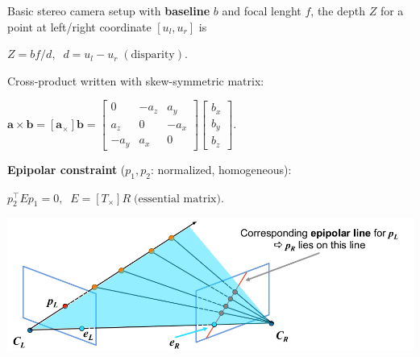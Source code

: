 \documentclass[landscape]{article}
\newcommand{\vmspace}{\vspace{-7pt}}
\newcommand{\vpspace}{\vspace{5pt}}
\begin{document}
\begin{multicols}{3}
\begin{minipage}{\columnwidth}
  Basic stereo camera setup with \textbf{baseline} $b$ and focal lenght $f$, the
  depth $Z$ for a point at left/right coordinate $[u_l,u_r]$ is
  \vmspace
  \begin{center}
    $Z = bf/d,\;\;
    d = u_l - u_r\;(\text{disparity}).$
  \end{center}
\end{minipage}
\vpspace

\begin{minipage}{\columnwidth}
  Cross-product written with skew-symmetric matrix:
  \vmspace
  \begin{center}
    $
    \mathbf a \times \mathbf b = [\mathbf a_\times ] \mathbf b
    =
    \left[
    \begin{matrix}
      0 & -a_z & a_y \\
      a_z & 0 & - a_x \\
      -a_y & a_x & 0
    \end{matrix}
    \right]
    \left[
    \begin{matrix}
      b_x \\
      b_y \\
      b_z
    \end{matrix}
    \right].
    $
  \end{center}
\end{minipage}

\vpspace

\begin{minipage}{\columnwidth}
  \textbf{Epipolar constraint} ($p_1, p_2$: normalized, homogeneous):
  \vmspace
  \begin{center}
    $p_2^\intercal E p_1 = 0,\;\; E = [T_\times]R\;\text{(essential matrix)}.$
  \end{center}
  \vspace{-18pt}
  \begin{center}
    \includegraphics[width=0.9\columnwidth]{img/5_EpipolarConstraint.png}
  \end{center}
\end{minipage}


\end{multicols}
\end{document}
